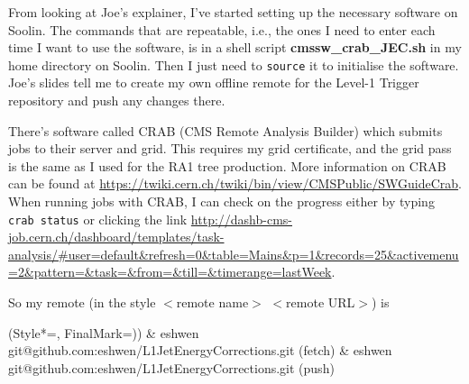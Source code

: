 From looking at Joe's explainer, I've started setting up the necessary software on Soolin. The commands that are repeatable, i.e., the ones I need to enter each time I want to use the software, is in a shell script \textbf{cmssw\_crab\_JEC.sh} in my home directory on Soolin. Then I just need to \texttt{source} it to initialise the software. Joe's slides tell me to create my own offline remote for the Level-1 Trigger repository and push any changes there.



There's software called CRAB (CMS Remote Analysis Builder) which submits jobs to their server and grid. This requires my grid certificate, and the grid pass is the same as I used for the RA1 tree production. More information on CRAB can be found at \url{https://twiki.cern.ch/twiki/bin/view/CMSPublic/SWGuideCrab}. When running jobs with CRAB, I can check on the progress either by typing \texttt{crab status} or clicking the link \url{http://dashb-cms-job.cern.ch/dashboard/templates/task-analysis/#user=default&refresh=0&table=Mains&p=1&records=25&activemenu=2&pattern=&task=&from=&till=&timerange=lastWeek}.


So my remote (in the style $<$remote name$>$ $<$remote URL$>$) is

\begin{easylist}
\ListProperties(Style*=, FinalMark={)})
& eshwen	\quad\quad git@github.com:eshwen/L1JetEnergyCorrections.git (fetch)
& eshwen	\quad\quad git@github.com:eshwen/L1JetEnergyCorrections.git (push)
\end{easylist}

